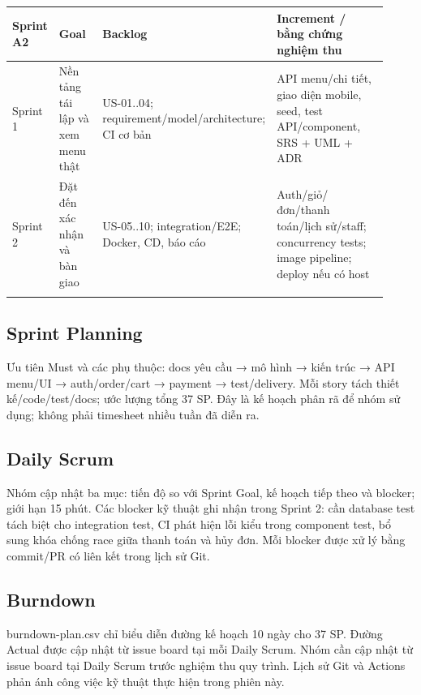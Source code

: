 \documentclass[a4paper,12pt,oneside]{report}
\begin{document}
\begingroup\fontsize{9}{11}\selectfont\setlength{\tabcolsep}{3pt}\renewcommand{\arraystretch}{1.35}
\begin{longtable}{@{}>{\raggedright\arraybackslash}p{0.12\linewidth} >{\raggedright\arraybackslash}p{0.18\linewidth} >{\raggedright\arraybackslash}p{0.12\linewidth} >{\raggedright\arraybackslash}p{0.5\linewidth}@{}}
\toprule
\textbf{Sprint A2} & \textbf{Goal} & \textbf{Backlog} & \textbf{Increment /\allowbreak{} bằng chứng nghiệm thu} \\
\midrule\endhead
Sprint 1 & Nền tảng tái lập và xem menu thật & US-01..04; requirement/\allowbreak{}model/\allowbreak{}architecture; CI cơ bản & API menu/\allowbreak{}chi tiết, giao diện mobile, seed, test API/\allowbreak{}component, SRS + UML + ADR \\
\addlinespace[2pt]
Sprint 2 & Đặt đến xác nhận và bàn giao & US-05..10; integration/\allowbreak{}E2E; Docker, CD, báo cáo & Auth/\allowbreak{}giỏ/\allowbreak{}đơn/\allowbreak{}thanh toán/\allowbreak{}lịch sử/\allowbreak{}staff; concurrency tests; image pipeline; deploy nếu có host \\
\addlinespace[2pt]
\bottomrule\end{longtable}\endgroup

\subsection{Sprint Planning}
Ưu tiên Must và các phụ thuộc: docs yêu cầu → mô hình → kiến trúc → API menu/\allowbreak{}UI → auth/\allowbreak{}order/\allowbreak{}cart → payment → test/\allowbreak{}delivery. Mỗi story tách thiết kế/\allowbreak{}code/\allowbreak{}test/\allowbreak{}docs; ước lượng tổng 37 SP. Đây là kế hoạch phân rã để nhóm sử dụng; không phải timesheet nhiều tuần đã diễn ra.


\subsection{Daily Scrum}
Nhóm cập nhật ba mục: tiến độ so với Sprint Goal, kế hoạch tiếp theo và blocker; giới hạn 15 phút. Các blocker kỹ thuật ghi nhận trong Sprint 2: cần database test tách biệt cho integration test, CI phát hiện lỗi kiểu trong component test, bổ sung khóa chống race giữa thanh toán và hủy đơn. Mỗi blocker được xử lý bằng commit/\allowbreak{}PR có liên kết trong lịch sử Git.


\subsection{Burndown}
{\small\ttfamily burndown-\allowbreak{}plan.\allowbreak{}csv} chỉ biểu diễn đường kế hoạch 10 ngày cho 37 SP. Đường Actual được cập nhật từ issue board tại mỗi Daily Scrum. Nhóm cần cập nhật từ issue board tại Daily Scrum trước nghiệm thu quy trình. Lịch sử Git và Actions phản ánh công việc kỹ thuật thực hiện trong phiên này.
\end{document}
